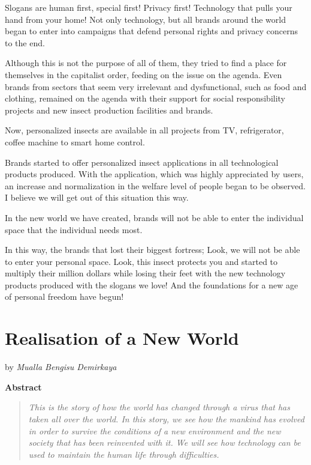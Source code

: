 \documentclass[]{book}
\begin{document}
Slogans are human first, special first! Privacy first! Technology that pulls your hand from your home! Not only technology, but all brands around the world began to enter into campaigns that defend personal rights and privacy concerns to the end.

Although this is not the purpose of all of them, they tried to find a place for themselves in the capitalist order, feeding on the issue on the agenda. Even brands from sectors that seem very irrelevant and dysfunctional, such as food and clothing, remained on the agenda with their support for social responsibility projects and new insect production facilities and brands.

Now, personalized insects are available in all projects from TV, refrigerator, coffee machine to smart home control.

Brands started to offer personalized insect applications in all technological products produced. With the application, which was highly appreciated by users, an increase and normalization in the welfare level of people began to be observed. I believe we will get out of this situation this way.

In the new world we have created, brands will not be able to enter the individual space that the individual needs most.

In this way, the brands that lost their biggest fortress; Look, we will not be able to enter your personal space. Look, this insect protects you and started to multiply their million dollars while losing their feet with the new technology products produced with the slogans we love! And the foundations for a new age of personal freedom have begun!

\hypertarget{realisation-of-a-new-world}{%
\chapter{Realisation of a New World}\label{realisation-of-a-new-world}}

by \emph{Mualla Bengisu Demirkaya}

\textbf{Abstract}

\begin{quote}
\emph{This is the story of how the world has changed through a virus that has taken all over the world. In this story, we see how the mankind has evolved in order to survive the conditions of a new environment and the new society that has been reinvented with it. We will see how technology can be used to maintain the human life through difficulties.}
\end{quote}
\end{document}
